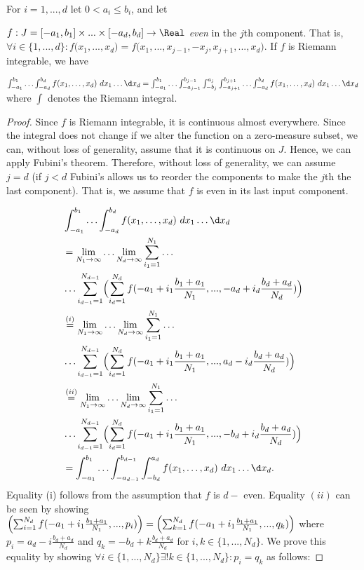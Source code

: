 \begin{lem} \label{lem:intcompeven}
For $i=1,...,d$ let $0 < a_i \leq b_i$, and let 

$f: J= [-a_1,b_1] \times ... \times [-a_d,b_d]\to \Real$ \textit{even} in the $j$th component. That is, $\forall i \in \{1,...,d\}: f\bigl( x_1,...,x_d \bigr) =  f\bigl( x_1,...,x_{j-1},-x_j,x_{j+1},...,x_d \bigr)$. If $f$ is Riemann integrable, we have 

$
\int_{-a_1}^{b_1} \ldots \int_{-a_{d}}^{b_{d}} f(x_1,\ldots,x_d ) \, \,dx_1 \ldots \d x_d \\
 =\int_{-a_1}^{b_1} \ldots\int_{-a_{j-1}}^{b_{j-1}} \int_{-b_j}^{a_j} \int_{-a_{j+1}}^{b_{j+1}} \ldots \int_{-a_{d}}^{b_{d}} f(x_1,\ldots,x_d ) \, \,dx_1 \ldots \d x_d  
$
where $\int $ denotes the Riemann integral.

\begin{proof}
Since $f$ is Riemann integrable, it is continuous almost everywhere. Since the integral does not change if we alter the function on a zero-measure subset, we can, without loss of generality, assume that it is continuous on $J$. Hence, we can apply Fubini's theorem. Therefore, without loss of generality, we can assume $j=d$ (if $j<d$ Fubini's allows us to reorder the components to make the $j$th the last component). That is, we assume that $f$ is even in its last input component.

\begin{align*}
&\int_{-a_1}^{b_1} \ldots \int_{-a_{d}}^{b_{d}} f(x_1,\ldots,x_d ) \, \,dx_1 \ldots \d x_d\\
% 
&=\lim_{N_1 \to \infty} \ldots \lim_{N_d \to \infty} \sum_{i_1=1}^{N_1} \ldots \\ 
&\ldots \sum_{i_{d-1}=1}^{N_{d-1}} \Bigl(\sum_{i_d=1}^{N_d} f(-a_1 + i_1 \frac{b_1+a_1}{N_1},...,-a_d + i_d \frac{b_d+a_d}{N_d})  \Bigr)\\
&\stackrel{(i)}{=}\lim_{N_1 \to \infty} \ldots \lim_{N_d \to \infty} \sum_{i_1=1}^{N_1} \ldots \\ 
&\ldots \sum_{i_{d-1}=1}^{N_{d-1}} \Bigl(\sum_{i_d=1}^{N_d} f(-a_1 + i_1 \frac{b_1+a_1}{N_1},...,a_d - i_d \frac{b_d+a_d}{N_d})  \Bigr)\\
&\stackrel{(ii)}{=}\lim_{N_1 \to \infty} \ldots \lim_{N_d \to \infty} \sum_{i_1=1}^{N_1} \ldots \\ 
&\ldots \sum_{i_{d-1}=1}^{N_{d-1}} \Bigl(\sum_{i_d=1}^{N_d} f(-a_1 + i_1 \frac{b_1+a_1}{N_1},...,-b_d + i_d \frac{b_d+a_d}{N_d})  \Bigr)\\
%
&=\int_{-a_1}^{b_1} \ldots \int_{-a_{d-1}}^{b_{d-1}} \int_{-b_{d}}^{a_{d}}f(x_1,\ldots,x_d ) \, \,dx_1 \ldots \d x_d.
\end{align*}
Equality (i) follows from the assumption that $f$ is $d-$ even.
Equality $(ii)$ can be seen by showing $\Bigl(\sum_{i=1}^{N_d} f(-a_1 + i_1 \frac{b_1+a_1}{N_1},...,p_i)  \Bigr) =\Bigl(\sum_{k=1}^{N_d} f(-a_1 + i_1 \frac{b_1+a_1}{N_1},...,q_k)  \Bigr) $ where $p_i = a_d - i \frac{b_d+a_d}{N_d}$ and $q_k = -b_d + k \frac{b_d+a_d}{N_d}$ for $i,k \in \{1,...,N_d\}$. 
We prove this equality by showing 
$\forall i \in \{1,...,N_d\} \exists !  k \in \{1,...,N_d\}: p_i = q_k $ as follows:


\end{proof}
\end{lem}
